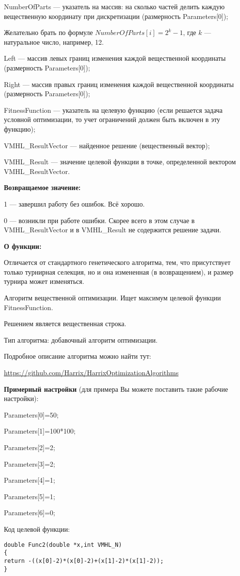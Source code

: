  NumberOfParts --- указатель на массив: на сколько частей делить каждую вещественную координату при дискретизации (размерность Parameters[0]);
 
  Желательно брать по формуле $NumberOfParts[i]=2^k-1$, где $k$ --- натуральное число, например, 12.
  
 Left --- массив левых границ изменения каждой вещественной координаты (размерность Parameters[0]);
 
 Right --- массив правых границ изменения каждой вещественной координаты (размерность Parameters[0]);
 
 FitnessFunction --- указатель на целевую функцию (если решается задача условной оптимизации, то учет ограничений должен быть включен в эту функцию);
 
 VMHL\_ResultVector --- найденное решение (вещественный вектор);
 
 VMHL\_Result --- значение целевой функции в точке, определенной вектором VMHL\_ResultVector.

\textbf{Возвращаемое значение:} 

 1 --- завершил работу без ошибок. Всё хорошо.
 
 0 --- возникли при работе ошибки. Скорее всего в этом случае в VMHL\_ResultVector и в VMHL\_Result не содержится решение задачи.

\textbf{О функции:}

Отличается от стандартного генетического алгоритма, тем, что присутствует только турнирная селекция, но и она измененная (в возвращением), и размер турнира может изменяться.

Алгоритм вещественной оптимизации. Ищет максимум целевой функции FitnessFunction.

Решением является вещественная строка.

Тип алгоритма: добавочный алгоритм оптимизации.

Подробное описание алгоритма можно найти тут:

\href{https://github.com/Harrix/HarrixOptimizationAlgorithms/blob/master/\_HarrixOptimizationAlgorithms.pdf}{https://github.com/Harrix/HarrixOptimizationAlgorithms}

\textbf{Примерный настройки} (для примера Вы можете поставить такие рабочие настройки):

 Parameters[0]=50;
 
Parameters[1]=100*100;

Parameters[2]=2;

Parameters[3]=2;

Parameters[4]=1;

Parameters[5]=1;

Parameters[6]=0;

Код целевой функции:
\begin{lstlisting}[caption=Оптимизируемая функция]
double Func2(double *x,int VMHL_N)
{
return -((x[0]-2)*(x[0]-2)+(x[1]-2)*(x[1]-2));
}
\end{lstlisting}